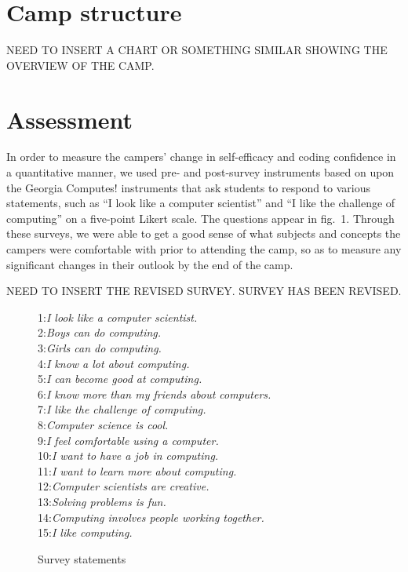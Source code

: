 \section{Camp structure}

NEED TO INSERT A CHART OR SOMETHING SIMILAR SHOWING THE OVERVIEW OF THE
CAMP.

\section{Assessment}

In order to measure the campers' change in self-efficacy and coding
confidence in a quantitative manner, we used pre- and post-survey
instruments based on upon the Georgia Computes! instruments
\cite{Bruckman2009} that ask students to respond to various statements,
such as ``I look like a computer scientist'' and ``I like the
challenge of computing'' on a five-point Likert scale.  The questions
appear in fig.~1.  Through these surveys, we were able to get a
good sense of what subjects and concepts the campers were comfortable
with prior to attending the camp, so as to measure any significant
changes in their outlook by the end of the camp.  

NEED TO INSERT THE REVISED SURVEY.
SURVEY HAS BEEN REVISED.

\begin{figure}
{\small
1:\textit{I look like a computer scientist.} \\
2:\textit{Boys can do computing.} \\
3:\textit{Girls can do computing.} \\
4:\textit{I know a lot about computing.} \\
5:\textit{I can become good at computing.} \\
6:\textit{I know more than my friends about computers.} \\
7:\textit{I like the challenge of computing.} \\
8:\textit{Computer science is cool.} \\
9:\textit{I feel comfortable using a computer.} \\
10:\textit{I want to have a job in computing.} \\
11:\textit{I want to learn more about computing.} \\
12:\textit{Computer scientists are creative.} \\
13:\textit{Solving problems is fun.} \\
14:\textit{Computing involves people working together.} \\
15:\textit{I like computing.} 
}
\caption{Survey statements}
\end{figure}

